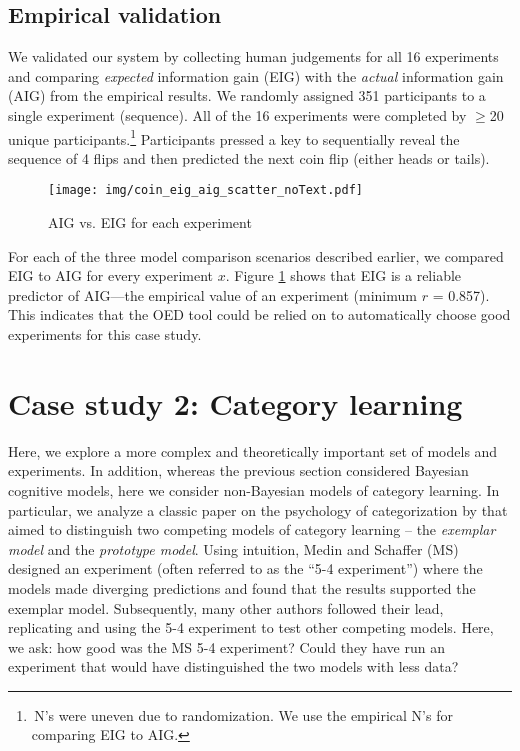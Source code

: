 \documentclass[10pt,letterpaper]{article}
\begin{document}
\subsection{Empirical validation}
We validated our system by collecting human judgements for all 16 experiments and comparing \emph{expected} information gain (EIG) with the \emph{actual} information gain (AIG) from the empirical results.
We randomly assigned 351 participants to a single experiment (sequence).
All of the 16 experiments were completed by $\geq$20 unique participants.\footnote{\,N's were uneven due to randomization. We use the empirical N's for comparing EIG to AIG.}
Participants pressed a key to sequentially reveal the sequence of 4 flips and then predicted the next coin flip (either heads or tails).

\begin{figure}[t]
 \texttt{[image: img/coin\_eig\_aig\_scatter\_noText.pdf]}
 \caption{AIG vs. EIG for each experiment}
  \label{fig:aig_vs_eig}
\end{figure}

For each of the three model comparison scenarios described earlier, we compared EIG to AIG for every experiment $x$.
Figure \ref{fig:aig_vs_eig} shows that EIG is a reliable predictor of AIG---the empirical value of an experiment (minimum $r$ = 0.857). This indicates that the OED tool could be relied on to automatically choose good experiments for this case study.

\section{Case study 2: Category learning}

Here, we explore a more complex and theoretically important set of models and experiments.
In addition, whereas the previous section considered Bayesian cognitive models, here we consider non-Bayesian models of category learning.
In particular, we analyze a classic paper on the psychology of categorization by \cite{medin78:pr} that aimed to distinguish two competing models of category learning -- the \emph{exemplar model} and the \emph{prototype model}.
Using intuition, Medin and Schaffer (MS) designed an experiment (often referred to as the ``5-4 experiment'') where the models made diverging predictions and found that the results supported the exemplar model.
Subsequently, many other authors followed their lead, replicating and using the 5-4 experiment to test other competing models.
Here, we ask: how good was the MS 5-4 experiment?
Could they have run an experiment that would have distinguished the two models with less data?
\end{document}
